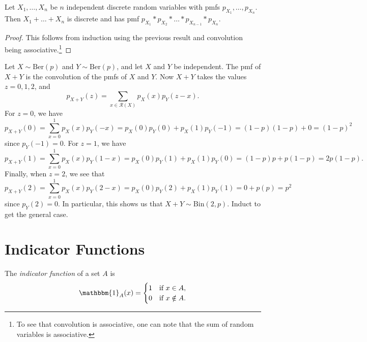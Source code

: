 \begin{prop}
  Let $X_1, \dots, X_n$ be $n$ independent discrete
  random variables with pmfs $p_{X_1}, \dots, p_{X_n}$. Then
  $X_1 + \dots + X_n$ is discrete and has pmf
  $p_{X_1} * p_{X_2} * \dots * p_{X_{n - 1}} * p_{X_n}$.
\end{prop}

\begin{proof}
  This follows from induction using the previous
  result and convolution being
  associative.\footnote{To see that convolution is associative, one can note that the sum of random variables is associative.}
\end{proof}

\begin{example}
  Let $X \sim \mathrm{Ber}(p)$ and $Y \sim \mathrm{Ber}(p)$,
  and let $X$ and $Y$ be independent. The pmf of
  $X + Y$ is the convolution of the pmfs of $X$ and $Y$.
  Now $X + Y$ takes the values $z = 0, 1, 2$, and
  \[
    p_{X + Y}(z) = \sum_{x \in \mathcal{R}(X)} p_X(x) p_Y(z - x).
  \]
  For $z = 0$, we have
  \[
    p_{X + Y}(0) = \sum_{x = 0}^1 p_X(x) p_Y(-x)
    = p_X(0) p_Y(0) + p_X(1) p_Y(-1)
    = (1 - p)(1 - p) + 0 = (1 - p)^2
  \]
  since $p_Y(-1) = 0$. For $z = 1$, we have
  \[
    p_{X + Y}(1) = \sum_{x = 0}^1 p_X(x) p_Y(1 - x)
    = p_X(0) p_Y(1) + p_X(1) p_Y(0)
    = (1 - p)p + p(1 - p) = 2p(1 - p).
  \]
  Finally, when $z = 2$, we see that
  \[
    p_{X + Y}(2) = \sum_{x = 0}^1 p_X(x) p_Y(2 - x)
    = p_X(0) p_Y(2) + p_X(1) p_Y(1)
    = 0 + p(p) = p^2
  \]
  since $p_Y(2) = 0$. In particular, this shows us
  that $X + Y \sim \mathrm{Bin}(2, p)$. Induct
  to get the general case.
\end{example}

\section{Indicator Functions}

\begin{definition}
  The \emph{indicator function} of a set $A$ is
  \[
    \mathbbm{1}_A(x) = \begin{cases}
      1 & \text{if } x \in A, \\
      0 & \text{if } x \notin A.
    \end{cases}
  \]
\end{definition}

